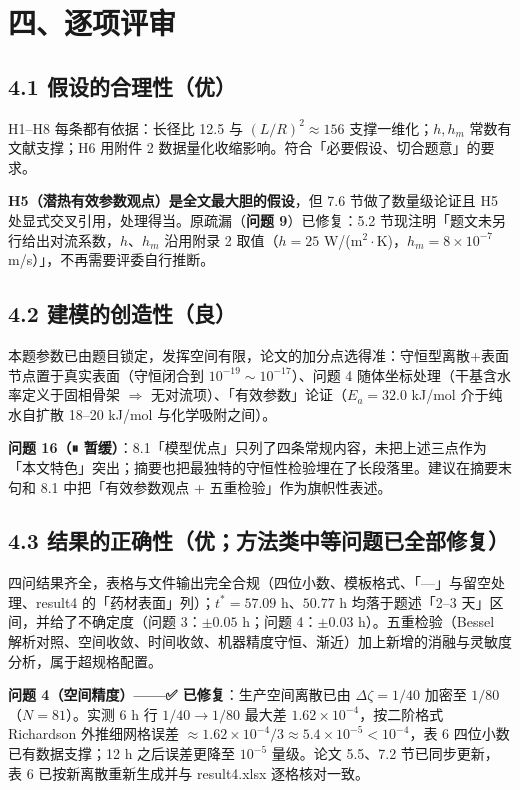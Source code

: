 \documentclass[12pt,a4paper]{ctexart}
\begin{document}
\section{四、逐项评审}

\subsection{4.1 假设的合理性（优）}

H1--H8 每条都有依据：长径比 12.5 与 $(L/R)^2\approx156$ 支撑一维化；$h,h_m$ 常数有文献支撑；H6 用附件 2 数据量化收缩影响。符合「必要假设、切合题意」的要求。

\textbf{H5（潜热有效参数观点）是全文最大胆的假设}，但 7.6 节做了数量级论证且 H5 处显式交叉引用，处理得当。原疏漏（\textbf{问题 9}）已修复：5.2 节现注明「题文未另行给出对流系数，$h$、$h_m$ 沿用附录 2 取值（$h=25$ W/(m$^2\!\cdot$K)，$h_m=8\times10^{-7}$ m/s）」，不再需要评委自行推断。

\subsection{4.2 建模的创造性（良）}

本题参数已由题目锁定，发挥空间有限，论文的加分点选得准：守恒型离散+表面节点置于真实表面（守恒闭合到 $10^{-19}\sim10^{-17}$）、问题 4 随体坐标处理（干基含水率定义于固相骨架 $\Rightarrow$ 无对流项）、「有效参数」论证（$E_a=32.0$ kJ/mol 介于纯水自扩散 18--20 kJ/mol 与化学吸附之间）。

\textbf{问题 16（⏸ 暂缓）}：8.1「模型优点」只列了四条常规内容，未把上述三点作为「本文特色」突出；摘要也把最独特的守恒性检验埋在了长段落里。建议在摘要末句和 8.1 中把「有效参数观点 + 五重检验」作为旗帜性表述。

\subsection{4.3 结果的正确性（优；方法类中等问题已全部修复）}

四问结果齐全，表格与文件输出完全合规（四位小数、模板格式、「---」与留空处理、result4 的「药材表面」列）；$t^*=57.09$ h、$50.77$ h 均落于题述「2--3 天」区间，并给了不确定度（问题 3：$\pm0.05$ h；问题 4：$\pm0.03$ h）。五重检验（Bessel 解析对照、空间收敛、时间收敛、机器精度守恒、渐近）加上新增的消融与灵敏度分析，属于超规格配置。

\textbf{问题 4（空间精度）——✅ 已修复}：生产空间离散已由 $\Delta\zeta=1/40$ 加密至 $1/80$（$N=81$）。实测 6 h 行 $1/40\to1/80$ 最大差 $1.62\times10^{-4}$，按二阶格式 Richardson 外推细网格误差 $\approx1.62\times10^{-4}/3\approx5.4\times10^{-5}<10^{-4}$，表 6 四位小数已有数据支撑；12 h 之后误差更降至 $10^{-5}$ 量级。论文 5.5、7.2 节已同步更新，表 6 已按新离散重新生成并与 result4.xlsx 逐格核对一致。
\end{document}
